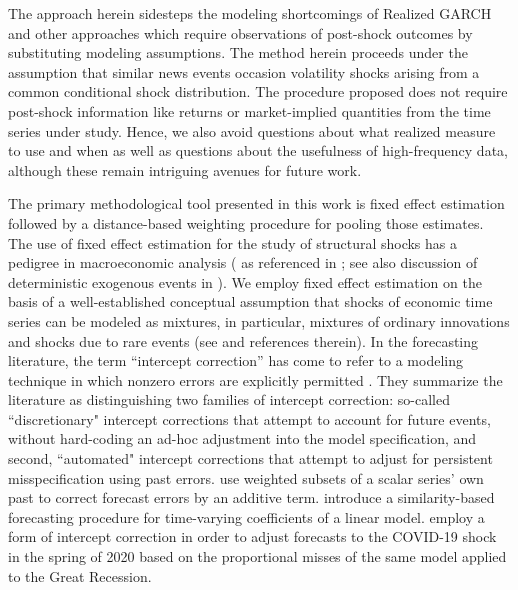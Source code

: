 \documentclass{uiucthesis2021}
\theoremstyle{definition}
\begin{document}
The approach herein sidesteps the modeling shortcomings of Realized GARCH and other approaches which require observations of post-shock outcomes
by substituting modeling assumptions.  The method herein proceeds under the assumption that similar news events occasion volatility shocks arising from a common conditional shock distribution.  The procedure proposed does not require post-shock information like returns or market-implied quantities from the time series under study.  Hence, we also avoid questions about what realized measure to use and when as well as questions about the usefulness of high-frequency data, although these remain intriguing avenues for future work.

The primary methodological tool presented in this work is fixed effect estimation followed by a distance-based weighting procedure for pooling those estimates.  The use of fixed effect estimation for the study of structural shocks has a pedigree in macroeconomic analysis (\citet{romer1989does} as referenced in \citet{kilian2017structural}; see also discussion of deterministic exogenous events in \citet{engle2001good}).  We employ fixed effect estimation on the basis of a well-established conceptual assumption that shocks of economic time series can be modeled as mixtures, in particular, mixtures of ordinary innovations and shocks due to rare events (see \cite{phillips1996forecasting} and references therein).  In the forecasting literature, the term ``intercept correction'' has come to refer to a modeling technique in which nonzero errors are explicitly permitted \citep{hendry1994theory, clements1998forecasting}.  They summarize the literature as distinguishing two families of intercept correction: so-called ``discretionary" intercept corrections that attempt to account for future events, without hard-coding an ad-hoc adjustment into the model specification, and second, ``automated" intercept corrections that attempt to adjust for persistent misspecification using past errors.  \citet{guerron2017macroeconomic} use weighted subsets of a scalar series' own past to correct forecast errors by an additive term. \citet{dendramis2020similarity} introduce a similarity-based forecasting procedure for time-varying coefficients of a linear model. \citet{foroni2022forecasting} employ a form of intercept correction in order to adjust forecasts to the COVID-19 shock in the spring of 2020 based on the proportional misses of the same model applied to the Great Recession.
\end{document}
